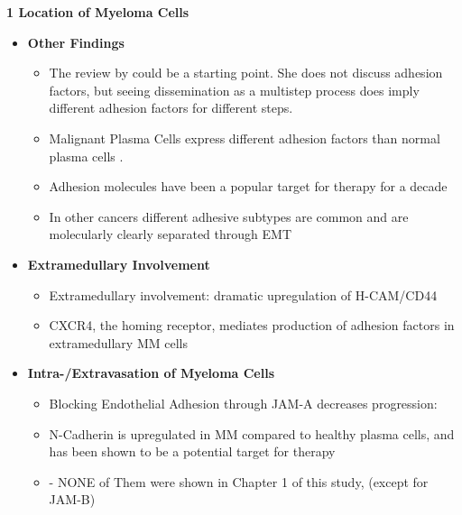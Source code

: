 \textbf{1 Location of Myeloma Cells}
\begin{itemize}
      \item \textbf{Other Findings}
            \begin{itemize}
                  \item The review by
                        \citet{zeissigTumourDisseminationMultiple2020} could be
                        a starting point. She does not discuss adhesion factors,
                        but seeing dissemination as a multistep process does
                        imply different adhesion factors for different steps.
                  \item Malignant Plasma Cells express different adhesion factors
                        than normal plasma cells \cite{cookRoleAdhesionMolecules1997, bouzerdanAdhesionMoleculesMultiple2022}.

                  \item Adhesion molecules have been a popular target for therapy for a decade \cite{nairChapterSixEmerging2012}
                  \item In other cancers different adhesive subtypes are common and are molecularly clearly separated through \ac{EMT} \cite{gengDynamicSwitchTwo2014}
            \end{itemize}

      \item \textbf{Extramedullary Involvement}
            \begin{itemize}
                  \item Extramedullary involvement:  dramatic upregulation of H-CAM/CD44 \cite{}
                  \item CXCR4, the homing receptor, mediates production of
                        adhesion factors in extramedullary MM cells \cite{roccaroCXCR4RegulatesExtraMedullary2015}
            \end{itemize}

      \item \textbf{Intra-/Extravasation of Myeloma Cells}
            \begin{itemize}
                  \item Blocking Endothelial Adhesion through JAM-A decreases progression: \cite{solimandoHaltingViciousCycle2020}
                  \item N-Cadherin is upregulated in MM compared to healthy plasma cells, and has been shown to be a potential target for therapy \cite{mrozikTherapeuticTargetingNcadherin2015}
                  \item - NONE of Them were shown in Chapter 1 of this study, (except for JAM-B)
            \end{itemize}


\end{itemize}
